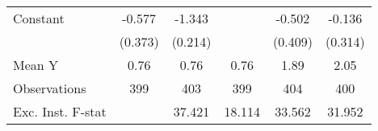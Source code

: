 {\begin{tabular}{l*{5}{c}}
\addlinespace
Constant            &      -0.577         &      -1.343\sym{***}&                     &      -0.502         &      -0.136         \\
                    &     (0.373)         &     (0.214)         &                     &     (0.409)         &     (0.314)         \\
\midrule
Mean Y              &        0.76         &        0.76         &        0.76         &        1.89         &        2.05         \\
Observations        &         399         &         403         &         399         &         404         &         400         \\
Exc. Inst. F-stat   &                     &      37.421         &      18.114         &      33.562         &      31.952         \\
\bottomrule
\end{tabular}
}
